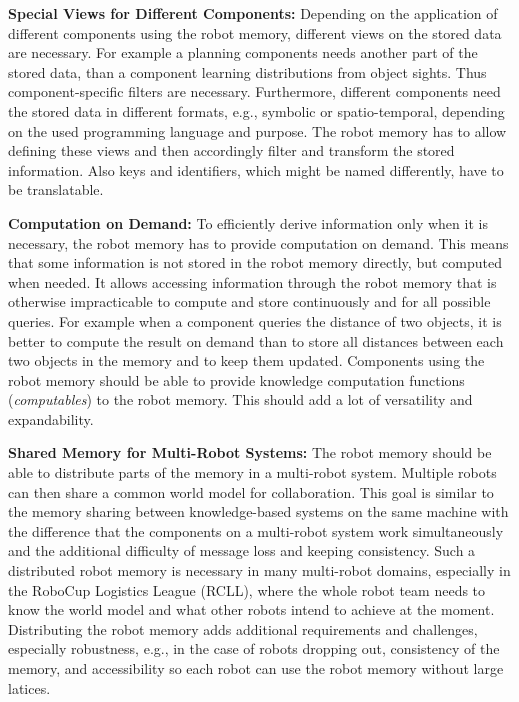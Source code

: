\textbf{Special Views for Different Components:} Depending on the
application of different components using the robot memory, different
views on the stored data are necessary. For example a planning
components needs another part of the stored data, than a component
learning distributions from object sights. Thus component-specific
filters are necessary. Furthermore, different components need the
stored data in different formats, e.g., symbolic or spatio-temporal,
depending on the used programming language and purpose. The robot
memory has to allow defining these views and then accordingly filter
and transform the stored information. Also keys and identifiers, which
might be named differently, have to be translatable.

\textbf{Computation on Demand:}
  To efficiently derive
information only when it is necessary, the robot memory has to provide
computation on demand. This means that some information is not stored
in the robot memory directly, but computed when needed. It allows
accessing information through the robot memory that is otherwise
impracticable to compute and store continuously and for all possible
queries. For example when a component queries the distance of two
objects, it is better to compute the result on demand than to store
all distances between each two objects in the memory and to keep them
updated. Components using the robot memory should be able to provide
knowledge computation functions (\emph{computables}) to the robot
memory. This should add a lot of versatility and expandability.

\textbf{Shared Memory for Multi-Robot Systems:} The robot memory
should be able to distribute parts of the memory in a multi-robot
system. Multiple robots can then share a common world model for
collaboration. This goal is similar to the memory sharing between
knowledge-based systems on the same machine with the difference that
the components on a multi-robot system work simultaneously and the
additional difficulty of message loss and keeping consistency. Such a
distributed robot memory is necessary in many multi-robot domains,
especially in the RoboCup Logistics League (RCLL), where the whole
robot team needs to know the world model and what other robots intend
to achieve at the moment.  Distributing the robot memory adds
additional requirements and challenges, especially robustness, e.g., in
the case of robots dropping out, consistency of the memory, and
accessibility so each robot can use the robot memory without large
latices.

